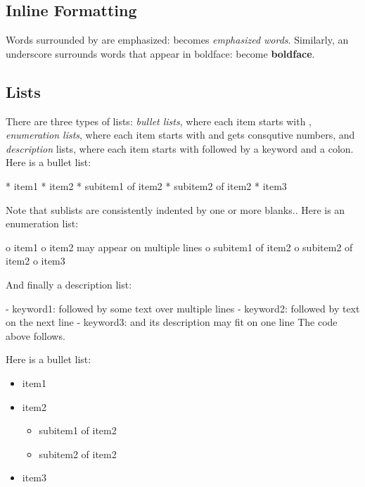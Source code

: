 \documentclass{book}
\begin{document}
\subsection{Inline Formatting}

Words surrounded by \code{*} are emphasized:  becomes
\emph{emphasized words}. Similarly, an underscore surrounds words that
appear in boldface:  become \textbf{boldface}.

\subsection{Lists}

There are three types of lists: \emph{bullet lists}, where each item starts
with \code{*}, \emph{enumeration lists}, where each item starts with  and gets
consqutive numbers,
and \emph{description} lists, where each item starts with \code{-} followed
by a keyword and a colon.
\bccq
Here is a bullet list:

 * item1
 * item2
  * subitem1 of item2
  * subitem2 of item2
 * item3

Note that sublists are consistently indented by one or more blanks..
Here is an enumeration list:

 o item1
 o item2
   may appear on
   multiple lines
  o subitem1 of item2
  o subitem2 of item2
 o item3

And finally a description list:

 - keyword1: followed by
   some text
   over multiple
   lines
 - keyword2:
   followed by text on the next line
 - keyword3: and its description may fit on one line
\eccq
The code above follows.

Here is a bullet list:

\begin{itemize}
 \item item1

 \item item2
\begin{itemize}

  \item subitem1 of item2

  \item subitem2 of item2

\end{itemize}

\noindent
 \item item3
\end{itemize}
\end{document}
